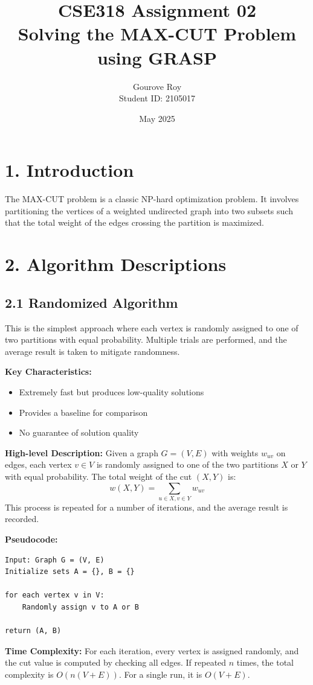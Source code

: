 \documentclass[11pt]{article}
\title{CSE318 Assignment 02\\Solving the MAX-CUT Problem using GRASP}
\author{Gourove Roy \\ Student ID: 2105017}
\date{May 2025}
\begin{document}
\maketitle

\section*{1. Introduction}
The MAX-CUT problem is a classic NP-hard optimization problem. It involves partitioning the vertices of a weighted undirected graph into two subsets such that the total weight of the edges crossing the partition is maximized.

\section*{2. Algorithm Descriptions}

\subsection*{2.1 Randomized Algorithm}
This is the simplest approach where each vertex is randomly assigned to one of two partitions with equal probability. Multiple trials are performed, and the average result is taken to mitigate randomness.

\textbf{Key Characteristics:}
\begin{itemize}
\item Extremely fast but produces low-quality solutions
\item Provides a baseline for comparison
\item No guarantee of solution quality
\end{itemize}

\textbf{High-level Description:}
Given a graph $G = (V, E)$ with weights $w_{uv}$ on edges, each vertex $v \in V$ is randomly assigned to one of the two partitions $X$ or $Y$ with equal probability. The total weight of the cut $(X, Y)$ is:
\[ w(X, Y) = \sum_{u \in X, v \in Y} w_{uv} \]
This process is repeated for a number of iterations, and the average result is recorded.

\textbf{Pseudocode:}
\begin{verbatim}
Input: Graph G = (V, E)
Initialize sets A = {}, B = {}

for each vertex v in V:
    Randomly assign v to A or B

return (A, B)
\end{verbatim}

\textbf{Time Complexity:} For each iteration, every vertex is assigned randomly, and the cut value is computed by checking all edges. If repeated $n$ times, the total complexity is $O(n(V+E))$. For a single run, it is $O(V+E)$.
\end{document}
